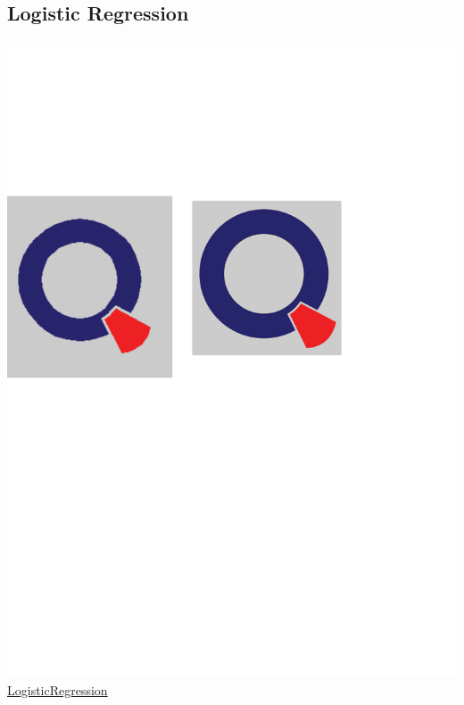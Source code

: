 \documentclass[12pt, a4paper, bibliography=totoc, english]{scrartcl}
\begin{document}
\subsection{Logistic Regression}
\includegraphics[scale=0.08]{qletlogo}
\textcolor{blue}{\href{https://github.com/JingyiLiu3136/MLFBM/blob/master/logisticregression/SPL_logisticregression.r}{LogisticRegression}}
\end{document}
